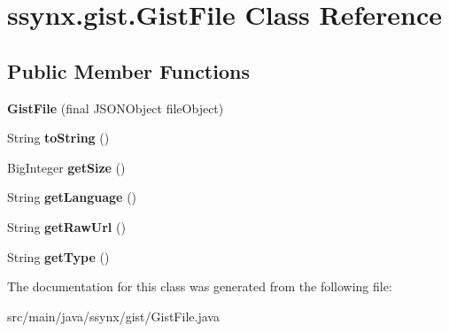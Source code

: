 \hypertarget{classssynx_1_1gist_1_1GistFile}{}\section{ssynx.\+gist.\+Gist\+File Class Reference}
\label{classssynx_1_1gist_1_1GistFile}
\subsection*{Public Member Functions}
\begin{DoxyCompactItemize}
\item 
\mbox{\label{classssynx_1_1gist_1_1GistFile_a2f553e4321e71e469b3533ebf61c0e6c}} 
{\bfseries Gist\+File} (final J\+S\+O\+N\+Object file\+Object)
\item 
\mbox{\label{classssynx_1_1gist_1_1GistFile_ab0e70323bcccd15f8eaa9855942e5322}} 
String {\bfseries to\+String} ()
\item 
\mbox{\label{classssynx_1_1gist_1_1GistFile_a8cc122b0b1eaf08ad077f31be2668c07}} 
Big\+Integer {\bfseries get\+Size} ()
\item 
\mbox{\label{classssynx_1_1gist_1_1GistFile_a9e1302d91ce9a4650553e60ffcd88e24}} 
String {\bfseries get\+Language} ()
\item 
\mbox{\label{classssynx_1_1gist_1_1GistFile_a1e1deb7ff50e2e511895a150ca1b8bb0}} 
String {\bfseries get\+Raw\+Url} ()
\item 
\mbox{\label{classssynx_1_1gist_1_1GistFile_a2e59b1d4ace289f9077fc8b8026f2a5f}} 
String {\bfseries get\+Type} ()
\end{DoxyCompactItemize}


The documentation for this class was generated from the following file\+:\begin{DoxyCompactItemize}
\item 
src/main/java/ssynx/gist/Gist\+File.\+java\end{DoxyCompactItemize}
